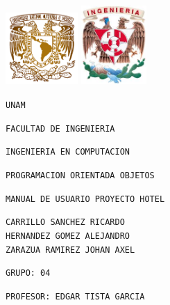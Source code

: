 \documentclass[12pt]{article}
\begin{document}
\begin{flushleft}
\includegraphics[width=2.75cm]{unam.png}\hspace{8cm} \includegraphics[width=2.5cm]{fac.png}
\end{flushleft}

\begin{center}
\begin{Huge}
\texttt{UNAM}
\end{Huge}

\vspace{0.5cm}
\begin{LARGE}
\texttt{FACULTAD DE INGENIERIA}

\vspace{0.5cm}
\texttt{INGENIERIA EN COMPUTACION}

\vspace{0.5cm}
\texttt{PROGRAMACION ORIENTADA OBJETOS}

\vspace{0.5cm}
\texttt{MANUAL DE USUARIO PROYECTO HOTEL}

\vspace{1cm}
\end{LARGE}

\vspace{0.5cm}
\begin{LARGE}
\texttt{CARRILLO SANCHEZ RICARDO\\HERNANDEZ GOMEZ ALEJANDRO\\ZARAZUA RAMIREZ JOHAN AXEL}

\vspace{1cm}
\texttt{GRUPO: 04}

\vspace{1cm}
\texttt{PROFESOR: EDGAR TISTA GARCIA}
\end{LARGE}
\end{center}
\end{document}
